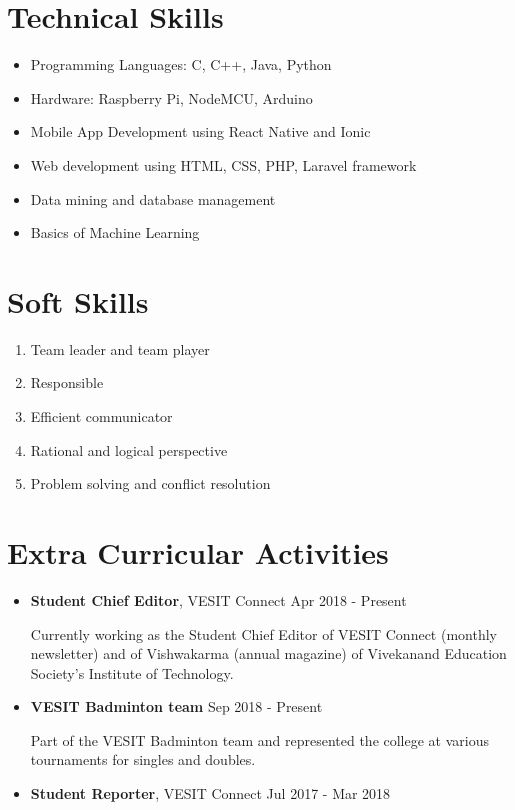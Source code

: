 \documentclass[margin]{res}
\begin{document}
\begin{resume}
\section{Technical Skills}
\begin{itemize}
  \item Programming Languages: C, C++, Java, Python
  \item Hardware: Raspberry Pi, NodeMCU, Arduino
  \item Mobile App Development using React Native and Ionic
  \item Web development using HTML, CSS, PHP, Laravel framework
  \item Data mining and database management
  \item Basics of Machine Learning
\end{itemize}

\section{Soft Skills}
\begin{enumerate}
  \item Team leader and team player
  \item Responsible
  \item Efficient communicator
  \item Rational and logical perspective
  \item Problem solving and conflict resolution
\end{enumerate}

\section{Extra Curricular Activities}
\begin{itemize}
  \item {\bf Student Chief Editor}, VESIT Connect \hfill Apr 2018 - Present
  
  Currently working as the Student Chief Editor of VESIT Connect (monthly newsletter) and of Vishwakarma (annual magazine)  of Vivekanand Education Society's Institute of Technology. 
  \item {\bf VESIT Badminton team} \hfill Sep 2018 - Present
  
  Part of the VESIT Badminton team and represented the college at various tournaments for singles and doubles. 
  \item {\bf Student Reporter}, VESIT Connect \hfill Jul 2017 - Mar 2018
  

\end{itemize}
\end{resume}
\end{document}
